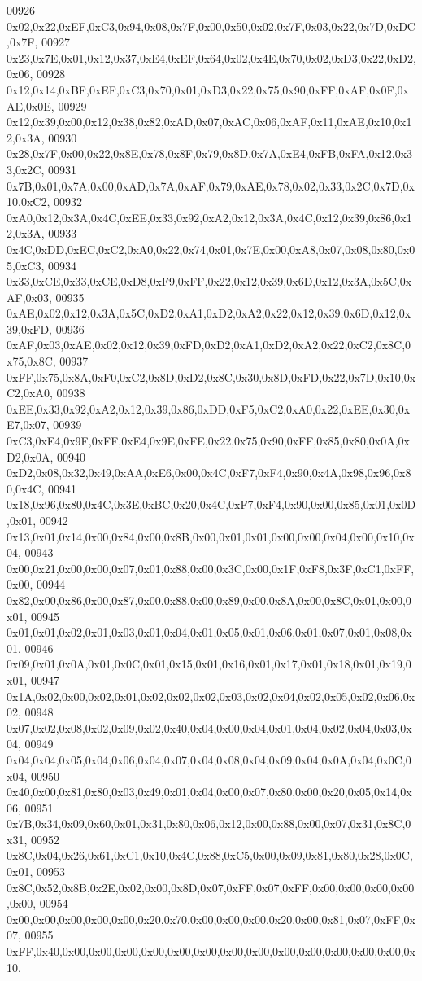 \begin{DoxyCode}
00926 0x02,0x22,0xEF,0xC3,0x94,0x08,0x7F,0x00,0x50,0x02,0x7F,0x03,0x22,0x7D,0xDC,0x7F,
00927 0x23,0x7E,0x01,0x12,0x37,0xE4,0xEF,0x64,0x02,0x4E,0x70,0x02,0xD3,0x22,0xD2,0x06,
00928 0x12,0x14,0xBF,0xEF,0xC3,0x70,0x01,0xD3,0x22,0x75,0x90,0xFF,0xAF,0x0F,0xAE,0x0E,
00929 0x12,0x39,0x00,0x12,0x38,0x82,0xAD,0x07,0xAC,0x06,0xAF,0x11,0xAE,0x10,0x12,0x3A,
00930 0x28,0x7F,0x00,0x22,0x8E,0x78,0x8F,0x79,0x8D,0x7A,0xE4,0xFB,0xFA,0x12,0x33,0x2C,
00931 0x7B,0x01,0x7A,0x00,0xAD,0x7A,0xAF,0x79,0xAE,0x78,0x02,0x33,0x2C,0x7D,0x10,0xC2,
00932 0xA0,0x12,0x3A,0x4C,0xEE,0x33,0x92,0xA2,0x12,0x3A,0x4C,0x12,0x39,0x86,0x12,0x3A,
00933 0x4C,0xDD,0xEC,0xC2,0xA0,0x22,0x74,0x01,0x7E,0x00,0xA8,0x07,0x08,0x80,0x05,0xC3,
00934 0x33,0xCE,0x33,0xCE,0xD8,0xF9,0xFF,0x22,0x12,0x39,0x6D,0x12,0x3A,0x5C,0xAF,0x03,
00935 0xAE,0x02,0x12,0x3A,0x5C,0xD2,0xA1,0xD2,0xA2,0x22,0x12,0x39,0x6D,0x12,0x39,0xFD,
00936 0xAF,0x03,0xAE,0x02,0x12,0x39,0xFD,0xD2,0xA1,0xD2,0xA2,0x22,0xC2,0x8C,0x75,0x8C,
00937 0xFF,0x75,0x8A,0xF0,0xC2,0x8D,0xD2,0x8C,0x30,0x8D,0xFD,0x22,0x7D,0x10,0xC2,0xA0,
00938 0xEE,0x33,0x92,0xA2,0x12,0x39,0x86,0xDD,0xF5,0xC2,0xA0,0x22,0xEE,0x30,0xE7,0x07,
00939 0xC3,0xE4,0x9F,0xFF,0xE4,0x9E,0xFE,0x22,0x75,0x90,0xFF,0x85,0x80,0x0A,0xD2,0x0A,
00940 0xD2,0x08,0x32,0x49,0xAA,0xE6,0x00,0x4C,0xF7,0xF4,0x90,0x4A,0x98,0x96,0x80,0x4C,
00941 0x18,0x96,0x80,0x4C,0x3E,0xBC,0x20,0x4C,0xF7,0xF4,0x90,0x00,0x85,0x01,0x0D,0x01,
00942 0x13,0x01,0x14,0x00,0x84,0x00,0x8B,0x00,0x01,0x01,0x00,0x00,0x04,0x00,0x10,0x04,
00943 0x00,0x21,0x00,0x00,0x07,0x01,0x88,0x00,0x3C,0x00,0x1F,0xF8,0x3F,0xC1,0xFF,0x00,
00944 0x82,0x00,0x86,0x00,0x87,0x00,0x88,0x00,0x89,0x00,0x8A,0x00,0x8C,0x01,0x00,0x01,
00945 0x01,0x01,0x02,0x01,0x03,0x01,0x04,0x01,0x05,0x01,0x06,0x01,0x07,0x01,0x08,0x01,
00946 0x09,0x01,0x0A,0x01,0x0C,0x01,0x15,0x01,0x16,0x01,0x17,0x01,0x18,0x01,0x19,0x01,
00947 0x1A,0x02,0x00,0x02,0x01,0x02,0x02,0x02,0x03,0x02,0x04,0x02,0x05,0x02,0x06,0x02,
00948 0x07,0x02,0x08,0x02,0x09,0x02,0x40,0x04,0x00,0x04,0x01,0x04,0x02,0x04,0x03,0x04,
00949 0x04,0x04,0x05,0x04,0x06,0x04,0x07,0x04,0x08,0x04,0x09,0x04,0x0A,0x04,0x0C,0x04,
00950 0x40,0x00,0x81,0x80,0x03,0x49,0x01,0x04,0x00,0x07,0x80,0x00,0x20,0x05,0x14,0x06,
00951 0x7B,0x34,0x09,0x60,0x01,0x31,0x80,0x06,0x12,0x00,0x88,0x00,0x07,0x31,0x8C,0x31,
00952 0x8C,0x04,0x26,0x61,0xC1,0x10,0x4C,0x88,0xC5,0x00,0x09,0x81,0x80,0x28,0x0C,0x01,
00953 0x8C,0x52,0x8B,0x2E,0x02,0x00,0x8D,0x07,0xFF,0x07,0xFF,0x00,0x00,0x00,0x00,0x00,
00954 0x00,0x00,0x00,0x00,0x00,0x20,0x70,0x00,0x00,0x00,0x20,0x00,0x81,0x07,0xFF,0x07,
00955 0xFF,0x40,0x00,0x00,0x00,0x00,0x00,0x00,0x00,0x00,0x00,0x00,0x00,0x00,0x00,0x10,

\end{DoxyCode}
